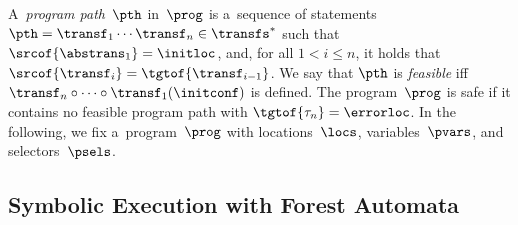 A~\emph{program path}~$\pth$ in~$\prog$ is a~sequence of statements
$\pth = \transf_1 \cdots \transf_n \in \transfs^*$ such that
$\srcof{\abstrans_1} = \initloc$, and,
for all $1 < i \leq n$, it holds that
$\srcof{\transf_i} = \tgtof{\transf_{i-1}}$.
%
We say that $\pth$ is \emph{feasible}
iff
$\transf_n\circ\cdots\circ\transf_1(\initconf)$ is defined.
%
The program~$\prog$ is safe if it contains no feasible program path with
$\tgtof{\tau_n} = \errorloc$.
In the following, we fix a~program~$\prog$ with locations~$\locs$, variables~$\pvars$, and selectors~$\psels$.


\subsection{Symbolic Execution with Forest Automata} \label{sec:analysis}


